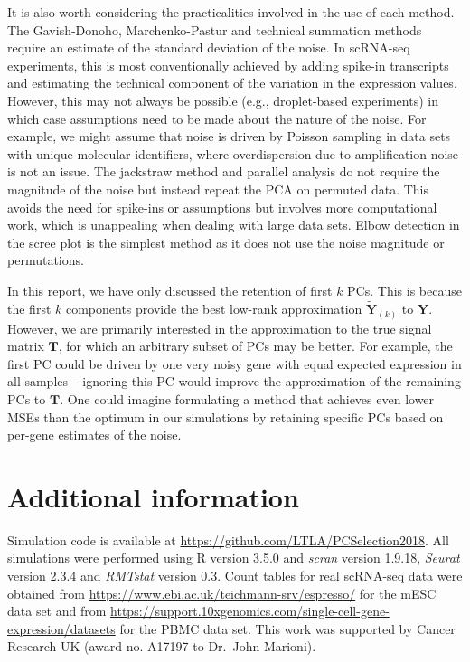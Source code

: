 \documentclass[10pt,letterpaper]{article}
\begin{document}
It is also worth considering the practicalities involved in the use of each method.
The Gavish-Donoho, Marchenko-Pastur and technical summation methods require an estimate of the standard deviation of the noise.
In scRNA-seq experiments, this is most conventionally achieved by adding spike-in transcripts and estimating the technical component of the variation in the expression values.
However, this may not always be possible (e.g., droplet-based experiments) in which case assumptions need to be made about the nature of the noise.
For example, we might assume that noise is driven by Poisson sampling in data sets with unique molecular identifiers, where overdispersion due to amplification noise is not an issue.
The jackstraw method and parallel analysis do not require the magnitude of the noise but instead repeat the PCA on permuted data.
This avoids the need for spike-ins or assumptions but involves more computational work, which is unappealing when dealing with large data sets.
Elbow detection in the scree plot is the simplest method as it does not use the noise magnitude or permutations.

In this report, we have only discussed the retention of first $k$ PCs.
This is because the first $k$ components provide the best low-rank approximation $\mathbf{\tilde Y}_{(k)}$ to $\mathbf{Y}$.
However, we are primarily interested in the approximation to the true signal matrix $\mathbf{T}$, for which an arbitrary subset of PCs may be better.
For example, the first PC could be driven by one very noisy gene with equal expected expression in all samples --
ignoring this PC would improve the approximation of the remaining PCs to $\mathbf{T}$.
One could imagine formulating a method that achieves even lower MSEs than the optimum in our simulations by retaining specific PCs based on per-gene estimates of the noise.


\section{Additional information}
Simulation code is available at {\small \url{https://github.com/LTLA/PCSelection2018}}.
All simulations were performed using R version 3.5.0 and \textit{scran} version 1.9.18, \textit{Seurat} version 2.3.4 and \textit{RMTstat} version 0.3.
Count tables for real scRNA-seq data were obtained from {\small \url{https://www.ebi.ac.uk/teichmann-srv/espresso/}} for the mESC data set 
and from {\small \url{https://support.10xgenomics.com/single-cell-gene-expression/datasets}} for the PBMC data set.
This work was supported by Cancer Research UK (award no. A17197 to Dr.\ John Marioni).



\end{document}
